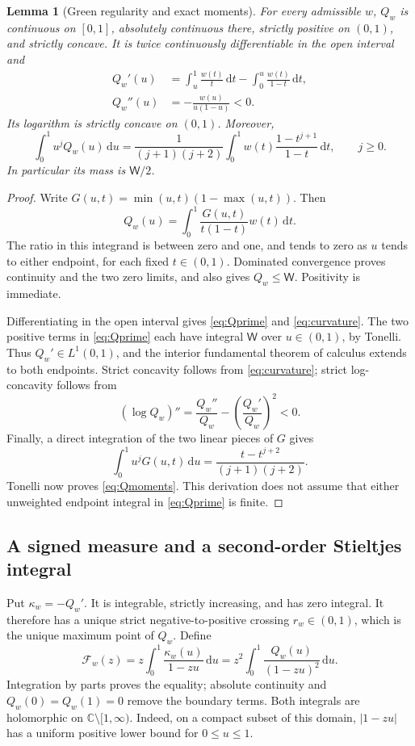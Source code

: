 \documentclass[11pt]{article}
\numberwithin{equation}{section}
\newtheorem{lemma}[theorem]{Lemma}
\theoremstyle{definition}
\theoremstyle{remark}
\newcommand{\dd}{\,\mathrm d}
\newcommand{\C}{\mathbb C}
\newcommand{\cut}{\C\setminus[1,\infty)}
\newcommand{\Qw}{Q_w}
\newcommand{\Wtot}{\mathsf W}
\begin{document}
\begin{lemma}[Green regularity and exact moments]\label{lem:green}
For every admissible $w$, $\Qw$ is continuous on $[0,1]$, absolutely
continuous there, strictly positive on $(0,1)$, and strictly concave.
It is twice continuously differentiable in the open interval and
\begin{align}
 \Qw'(u)&=\int_u^1\frac{w(t)}t\dd t
                    -\int_0^u\frac{w(t)}{1-t}\dd t,
                    \label{eq:Qprime}\\
 \Qw''(u)&=-\frac{w(u)}{u(1-u)}<0.\label{eq:curvature}
\end{align}
Its logarithm is strictly concave on $(0,1)$. Moreover,
\begin{equation}\label{eq:Qmoments}
 \int_0^1u^j\Qw(u)\dd u
 =\frac1{(j+1)(j+2)}
   \int_0^1 w(t)\frac{1-t^{j+1}}{1-t}\dd t,
 \qquad j\ge0.
\end{equation}
In particular its mass is $\Wtot/2$.
\end{lemma}
\begin{proof}
Write $G(u,t)=\min(u,t)(1-\max(u,t))$. Then
\[
 \Qw(u)=\int_0^1\frac{G(u,t)}{t(1-t)}w(t)\dd t.
\]
The ratio in this integrand is between zero and one, and tends to zero
as $u$ tends to either endpoint, for each fixed $t\in(0,1)$.
Dominated convergence proves continuity and the two zero limits, and
also gives $\Qw\le\Wtot$. Positivity is immediate.

Differentiating in the open interval gives \eqref{eq:Qprime} and
\eqref{eq:curvature}. The two positive terms in \eqref{eq:Qprime} each
have integral $\Wtot$ over $u\in(0,1)$, by Tonelli. Thus
$\Qw'\in L^1(0,1)$, and the interior fundamental theorem of calculus
extends to both endpoints. Strict concavity follows from
\eqref{eq:curvature}; strict log-concavity follows from
\[
 (\log\Qw)''=\frac{\Qw''}{\Qw}
                        -\left(\frac{\Qw'}{\Qw}\right)^2<0.
\]
Finally, a direct integration of the two linear pieces of $G$ gives
\[
 \int_0^1u^jG(u,t)\dd u
       =\frac{t-t^{j+2}}{(j+1)(j+2)}.
\]
Tonelli now proves \eqref{eq:Qmoments}. This derivation does not assume
that either unweighted endpoint integral in \eqref{eq:Qprime} is finite.
\end{proof}

\subsection{A signed measure and a second-order Stieltjes integral}
Put $\kappa_w=-\Qw'$. It is integrable, strictly increasing, and has
zero integral. It therefore has a unique strict negative-to-positive
crossing $r_w\in(0,1)$, which is the unique maximum point of $\Qw$.
Define
\begin{equation}\label{eq:Fw}
 \mathcal F_w(z)=z\int_0^1\frac{\kappa_w(u)}{1-zu}\dd u
             =z^2\int_0^1\frac{\Qw(u)}{(1-zu)^2}\dd u.
\end{equation}
Integration by parts proves the equality; absolute continuity and
$\Qw(0)=\Qw(1)=0$ remove the boundary terms. Both integrals are
holomorphic on $\cut$. Indeed, on a compact subset of this domain,
$|1-zu|$ has a uniform positive lower bound for $0\le u\le1$.
\end{document}

